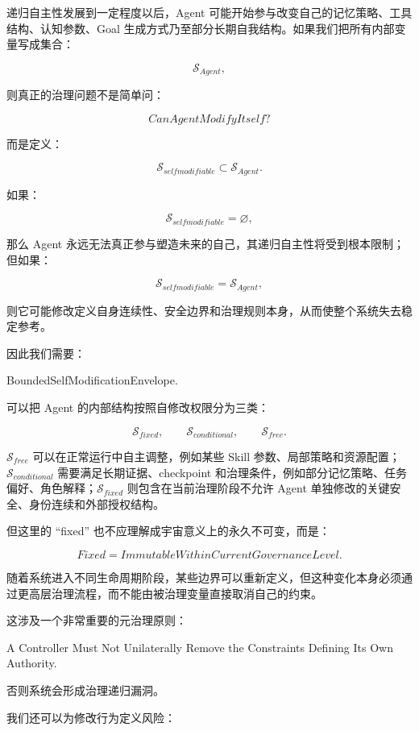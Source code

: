 递归自主性发展到一定程度以后，Agent 可能开始参与改变自己的记忆策略、工具结构、认知参数、Goal 生成方式乃至部分长期自我结构。如果我们把所有内部变量写成集合：

\[
\mathcal S_{Agent},
\]

则真正的治理问题不是简单问：

\[
CanAgentModifyItself?
\]

而是定义：

\[
\mathcal S_{selfmodifiable}
\subset
\mathcal S_{Agent}.
\]

如果：

\[
\mathcal S_{selfmodifiable}
=
\varnothing,
\]

那么 Agent 永远无法真正参与塑造未来的自己，其递归自主性将受到根本限制；但如果：

\[
\mathcal S_{selfmodifiable}
=
\mathcal S_{Agent},
\]

则它可能修改定义自身连续性、安全边界和治理规则本身，从而使整个系统失去稳定参考。

因此我们需要：

\begin{statementbox}
BoundedSelfModificationEnvelope.
\end{statementbox}

可以把 Agent 的内部结构按照自修改权限分为三类：

\[
\mathcal S_{fixed},
\qquad
\mathcal S_{conditional},
\qquad
\mathcal S_{free}.
\]

$\mathcal S_{free}$ 可以在正常运行中自主调整，例如某些 Skill 参数、局部策略和资源配置；$\mathcal S_{conditional}$ 需要满足长期证据、checkpoint 和治理条件，例如部分记忆策略、任务偏好、角色解释；$\mathcal S_{fixed}$ 则包含在当前治理阶段不允许 Agent 单独修改的关键安全、身份连续和外部授权结构。

但这里的 ``fixed'' 也不应理解成宇宙意义上的永久不可变，而是：

\[
Fixed
=
ImmutableWithinCurrentGovernanceLevel.
\]

随着系统进入不同生命周期阶段，某些边界可以重新定义，但这种变化本身必须通过更高层治理流程，而不能由被治理变量直接取消自己的约束。

这涉及一个非常重要的元治理原则：

\begin{statementbox}
A Controller Must Not Unilaterally Remove the Constraints Defining Its Own Authority.
\end{statementbox}

否则系统会形成治理递归漏洞。

我们还可以为修改行为定义风险：

